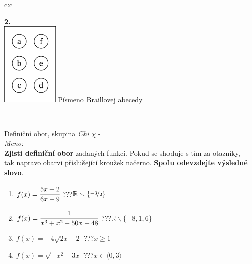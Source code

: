 \documentclass[10pt]{report}
\begin{document}
\begin{tabular}{c:c}
\begin{minipage}[c][99mm][t]{0.49\linewidth}
\begin{center}
\begin{minipage}{0.77\linewidth}
\begin{center}
\begin{varwidth}{\textwidth}
\begin{enumerate}
\end{enumerate}
\end{varwidth}
\end{center}
\end{minipage}
\begin{minipage}{0.20\linewidth}
\begin{center}
{\Huge\bfseries 2.} \\[2mm]
\includegraphics[height=40mm]{../images/braille.png}
{\small Písmeno Braillovej abecedy}
\end{center}
\end{minipage}
\end{center}
\end{minipage}
\\ \hdashline
\begin{minipage}[c][99mm][t]{0.49\linewidth}
\begin{center}
\vspace{7mm}
{\huge Definiční obor, skupina \textit{Chi $\chi$} -}\\[4.5mm]
\textit{Meno:}\phantom{xxxxxxxxxxxxxxxxxxxxxxxxxxxxxxxxxxxxxxxxxxxxxxxxxxxxxxxxxxxxxxxxx}\\[3.5mm]
\textbf{Zjisti definiční obor} zadaných funkcí. Pokud se shoduje s tím za otazníky,\\tak napravo obarvi příslušející kroužek načerno. \textbf{Spolu odevzdejte výsledné slovo}.\\[3mm]
\begin{minipage}{0.77\linewidth}
\begin{center}
\begin{varwidth}{\textwidth}
\begin{enumerate}
\normalsize
\item $f(x)=\cfrac{5x+2}{6x-9}$\quad \dotfill\; ???\;\dotfill \quad $\mathbb{R}\smallsetminus\{\nicefrac{-3}{2}\}$
\item $f(x)=\cfrac{1}{x^3+x^2-50x+48}$\quad \dotfill\; ???\;\dotfill \quad $\mathbb{R}\smallsetminus\{-8,1,6\}$
\item $f(x)=-4\sqrt{2x-2}$\quad \dotfill\; ???\;\dotfill \quad $x\geq1$
\item $f(x)=\sqrt{-x^2-3x}$\quad \dotfill\; ???\;\dotfill \quad $x\in\langle0 , 3\rangle$

\end{enumerate}
\end{varwidth}
\end{center}
\end{minipage}
\end{center}
\end{minipage}
\end{tabular}
\end{document}
